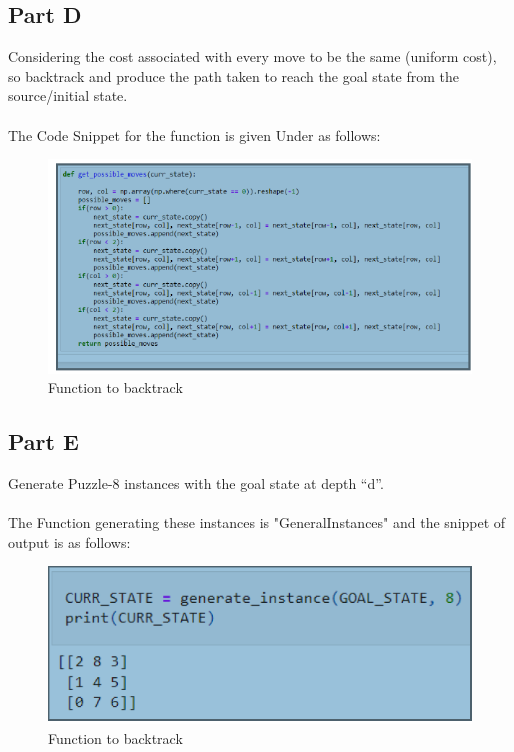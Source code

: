 \documentclass[conference]{IEEEtran}
\begin{document}
\subsection{Part D}
Considering the cost associated with every move to be the
same (uniform cost), so backtrack
and produce the path taken to reach the goal state from the
source/initial state.
\\
\\
The Code Snippet for the function is given Under as follows:
\begin{figure}[htbp]
\centerline{\includegraphics[scale=0.7]{fun.png}}
\caption{Function to backtrack}
\label{fig}
\end{figure}

\subsection{Part E}
\newline
Generate Puzzle-8 instances with the goal state at depth “d”.
\\
\\
The Function generating these instances is "GeneralInstances" and the snippet of output is as follows:
\begin{figure}[htbp]
\centerline{\includegraphics[scale=0.7]{bac.png}}
\caption{Function to backtrack}
\label{fig}
\end{figure}
\end{document}
